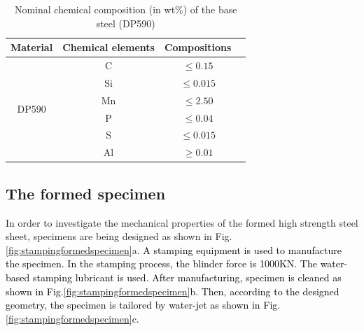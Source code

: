 \documentclass[review]{elsarticle}
\begin{document}
\begin{table}[h!]
\centering
\caption{Nominal chemical composition (in wt\%) of the base steel (DP590)}
\begin{tabular}{c c c c} 
 \hline
 Material & Chemical elements & Compositions \\
 \hline
 \multirow{7}{4em}{DP590} & C & $\leq 0.15$ \\ 
& Si & $\leq 0.015$ \\
& Mn & $\leq 2.50$ \\
& P & $\leq 0.04$ \\
& S & $\leq 0.015$ \\
& Al & $\geq 0.01$\\
 \hline
\end{tabular}
\label{table:material}
\end{table}

\subsection{The formed specimen}

In order to investigate the mechanical properties of the formed high strength steel sheet, specimens are being designed as shown in Fig.\ref{fig:stampingformedspecimen}a. \textcolor{black}{A stamping equipment is used to manufacture the specimen. In the stamping process, the blinder force is 1000KN. The water-based stamping lubricant is used. After manufacturing, specimen is cleaned as shown in Fig.\ref{fig:stampingformedspecimen}b. Then, according to the designed geometry, the specimen is tailored by water-jet as shown in Fig.\ref{fig:stampingformedspecimen}c.}
\end{document}
